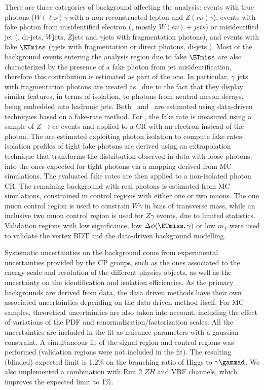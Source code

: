 There are three categories of background affecting the analysis: events with true photons ($W(\ell\nu)\gamma$ with a non reconstructed lepton and $Z(\nu\nu)\gamma$), events with fake photon from misidentified electron (\efakey, mostly $W(e\nu)+jets$) or misidentified jet (\jfakey, di-jets, $W$jets, $Z$jets and $\gamma$jets with fragmentation photons), and events with fake $\ETmiss$ ($\gamma$jets with fragmentation or direct photons, di-jets ). Most of the background events entering the analysis region due to fake $\ETmiss$ are also characterized by the presence of a fake photon from jet misidentification, therefore this contribution is estimated as part of the \jfakey one. In particular, $\gamma$ jets with fragmentation photons are treated as \jfakey\, due to the fact that they display similar features, in terms of isolation, to photons from neutral meson decays, being embedded into hadronic jets. 
Both \efakey\, and \jfakey\, are estimated using data-driven techniques based on a fake-rate method. For \efakey, the fake rate is measured using a sample of $Z\rightarrow ee$ events and applied to a CR with an electron instead of the photon. 
The \jfakey are estimated exploiting photon isolation to compute fake rates: isolation profiles of tight fake photons are derived using an extrapolation technique that transforms the
distribution observed in data with loose photons, into the ones expected for tight photons via a mapping derived from MC simulations. The evaluated fake rates are then applied to a non-isolated photon CR. 
The remaining background with real photons is estimated from MC simulations, constrained in control regions with either one or two muons. The one muon control region is used to constrain $W\gamma$ in bins of transverse mass, while an inclusive two muon control region is used for $Z\gamma$ events, due to limited statistics. 
Validation regions with low \ETmiss significance, low $\Delta\phi(\ETmiss,\gamma)$ or low $m_T$ were used to validate the vertex BDT and the data-driven background modelling.

Systematic uncertainties on the background come from experimental uncertainties provided by the CP groups, such as the ones associated to the energy scale and resolution of the different physics objects, as well as the uncertainty on the identification and isolation efficiencies. As the primary backgrounds are derived from data, the data driven methods have their own associated uncertainties depending on the data-driven method itself. For MC samples, theoretical uncertainties are also taken into account, including the effect of variations of the PDF and renormalization/factorization scales. 
All the uncertainties are included in the fit as nuisance parameters with a gaussian constraint. 
A simultaneous fit of the signal region and control regions was performed (validation regions were not included in the fit). The resulting (blinded) expected limit is 1.2\% on the branching ratio of Higgs to $\gamma\gammad$. We also implemented a combination with Run 2 $ZH$ and VBF channels, which improves the expected limit to 1\%. 

